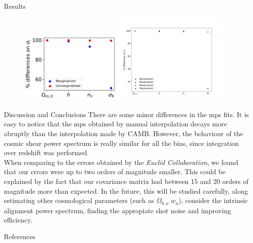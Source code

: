 \begin{frame}[t]
\begin{columns}[t]
\begin{column}{.465\textwidth}
\begin{block}{Results}
\begin{figure}
    \centering
    \includegraphics[width=0.45\textwidth]{fig_results/sigmas.png}
    \includegraphics[width=0.5\textwidth]{fig_results/SIGMAS.png}
    \label{mps}
\end{figure}

\end{block}

\begin{block}{Discussion and Conclusions}
There are some minor differences in the mps fits. It is easy to notice that the mps obtained by manual interpolation decays more abruptly than the interpolation made by CAMB. However, the behaviour of the cosmic shear power spectrum is really similar for all the bins, since integration over redshift was performed.\\

When comparing to the errors obtained by the \textit{Euclid Collaboration}, we found that our errors were up to two orders of magnitude smaller. This could be explained by the fact that our covariance matrix had between 15 and 20 orders of magnitude more than expected. In the future, this will be studied carefully, along estimating other cosmological parameters (such as $\Omega_{b,o}$ $w_a$), consider the intrinsic alignment power spectrum, finding the appropiate shot noise and improving efficiency.

\end{block}

\begin{block}{References}
        

\end{block}
\end{column}
\end{columns}
\end{frame}
